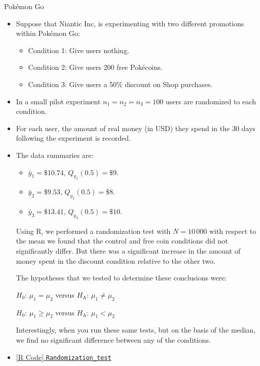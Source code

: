 \begin{Example}{Pokémon Go}{}
      \begin{itemize}
            \item Suppose that Niantic Inc, is experimenting with two different promotions within Pokémon
                  Go:
                  \begin{itemize}
                        \item Condition 1: Give users nothing.
                        \item Condition 2: Give users 200 free Pokécoins.
                        \item Condition 3: Give users a 50\% discount on Shop purchases.
                  \end{itemize}
            \item In a small pilot experiment $ n_1=n_2=n_3=100 $ users are randomized to each condition.
            \item For each user, the amount of real money (in USD) they spend in the 30 days following
                  the experiment is recorded.
            \item The data summaries are:
                  \begin{itemize}
                        \item $ \bar{y}_1=\$10.74 $, $ Q_{y_1}(0.5)=\$9 $.
                        \item $ \bar{y}_2=\$9.53 $, $ Q_{y_2}(0.5)=\$8 $.
                        \item $ \bar{y}_3=\$13.41 $, $ Q_{y_3}(0.5)=\$10 $.
                  \end{itemize}
                  Using R, we performed a randomization test with $ N=10\,000 $ with respect to the mean
                  we found that the control and free coin conditions did not significantly differ.
                  But there was a significant increase in the amount of money spent in the discount condition
                  relative to the other two.

                  \vspace{2mm}

                  The hypotheses that we tested to determine these conclusions were:

                  \centerline{$ H_0 $: $ \mu_1=\mu_2 $ versus $ H_\text{A} $: $ \mu_1\ne \mu_2 $}
                  \centerline{$ H_0 $: $ \mu_1\ge \mu_2 $ versus $ H_\text{A} $: $ \mu_1<\mu_2 $}

                  Interestingly, when you run these same tests, but on the basis of the median, we find
                  no significant difference between any of the conditions.
            \item \href{https://github.com/Hextical/university-notes/blob/master/year-3/semester-3/STAT 430/code/Randomization_test.R}{[R Code] \texttt{Randomization\_test}}
      \end{itemize}
\end{Example}
